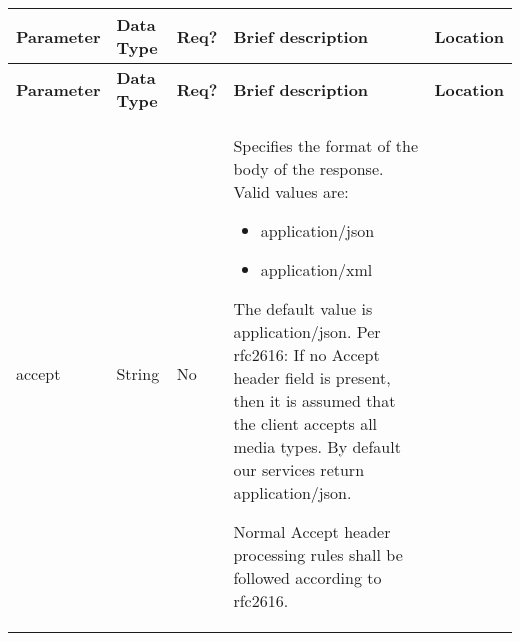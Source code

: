 \begin{longtable}{|>{\raggedright}p{}|>{\raggedright}p{}|>{\raggedright}p{}|>{\raggedright}p{}|>{\raggedright}p{}|}
\hline
\hline 
\textbf{\footnotesize{Parameter }} & \textbf{\footnotesize{Data Type}} & \textbf{\footnotesize{Req?}} & \textbf{\footnotesize{Brief description}} & \textbf{\footnotesize{Location}}\tabularnewline
\hline 
\hline
\endfirsthead
\hline
\hline 
\textbf{\footnotesize{Parameter }} & \textbf{\footnotesize{Data Type}} & \textbf{\footnotesize{Req?}} & \textbf{\footnotesize{Brief description}} & \textbf{\footnotesize{Location}}\tabularnewline
\hline 
\hline
\endhead
\hline 
{\footnotesize{accept}} & {\footnotesize{String}} & {\footnotesize{No}} & {\footnotesize{Specifies the format of the body of the response. Valid
values are: }}{\footnotesize \par}
\begin{itemize}
\item {\footnotesize{application/json}}{\footnotesize \par}
\item {\footnotesize{application/xml}}{\footnotesize \par}
\end{itemize}
{\footnotesize{The default value is application/json. Per rfc2616:
\textquotedbl{}If no Accept header field is present, then it is assumed
that the client accepts all media types.\textquotedbl{} By default
our services return application/json.}}{\footnotesize \par}

{\footnotesize{Normal Accept header processing rules shall be followed
according to rfc2616.}}{\footnotesize \par}


\end{longtable}
